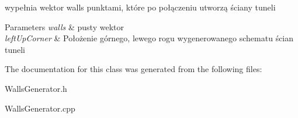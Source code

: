 wypełnia wektor walls punktami, które po połączeniu utworzą ściany tuneli 
\begin{DoxyParams}{Parameters}
{\em walls} & pusty wektor \\
\hline
{\em left\+Up\+Corner} & Położenie górnego, lewego rogu wygenerowanego schematu ścian tuneli \\
\hline
\end{DoxyParams}


The documentation for this class was generated from the following files\+:\begin{DoxyCompactItemize}
\item 
Walls\+Generator.\+h\item 
Walls\+Generator.\+cpp\end{DoxyCompactItemize}
